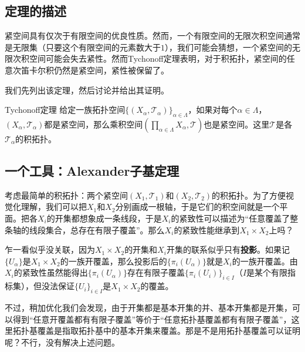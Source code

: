 

\subsection{定理的描述}

紧空间具有仅次于有限空间的优良性质。然而，一个有限空间的无限次积空间通常是无限集（只要这个有限空间的元素数大于$1$），我们可能会猜想，一个紧空间的无限次积空间可能会失去紧性。然而Tychonoff定理表明，对于积拓扑，紧空间的任意次笛卡尔积仍然是紧空间，紧性被保留了。

我们先列出该定理，然后讨论并给出其证明。

\begin{theorem}{Tychonoff定理}
给定一族拓扑空间$\{(X_\alpha, \mathcal{T}_\alpha)\}_{\alpha\in \Lambda}$，如果对每个$\alpha\in\Lambda$，$(X_\alpha, \mathcal{T}_\alpha)$都是紧空间，那么乘积空间$(\prod_{\alpha\in\Lambda}X_\alpha, \mathcal{T})$也是紧空间。这里$\mathcal{T}$是各$\mathcal{T}_\alpha$的积拓扑。
\end{theorem}



\subsection{一个工具：Alexander子基定理}

考虑最简单的积拓扑：两个紧空间$(X_1, \mathcal{T}_1)$和$(X_2, \mathcal{T}_2)$的积拓扑。为了方便视觉化理解，我们可以把$X_1$和$X_2$分别画成一根轴，于是它们的积空间就是一个平面。把各$X_i$的开集都想象成一条线段，于是$X_i$的紧致性可以描述为“任意覆盖了整条轴的线段集合，总存在有限子覆盖”。那么$X_i$的紧致性能继承到$X_1\times X_2$上吗？

乍一看似乎没关联，因为$X_1\times X_2$的开集和$X_i$开集的联系似乎只有\textbf{投影}。如果记$\{U_\alpha\}$是$X_1\times X_2$的一族开覆盖，那么投影后的$\{\pi_i(U_\alpha)\}$就是$X_i$的一族开覆盖。由$X_i$的紧致性虽然能得出$\{\pi_i(U_\alpha)\}$存在有限子覆盖$\{\pi_i(U_i)\}_{i\in I}$（$I$是某个有限指标集），但没法保证$\{U_i\}_{i\in I}$是$X_1\times X_2$的覆盖。

不过，稍加优化我们会发现，由于开集都是基本开集的并、基本开集都是开集，可以得到“任意开覆盖都有有限子覆盖”等价于“任意拓扑基覆盖都有有限子覆盖”，这里拓扑基覆盖是指取拓扑基中的基本开集来覆盖。那是不是用拓扑基覆盖可以证明呢？不行，没有解决上述问题。

